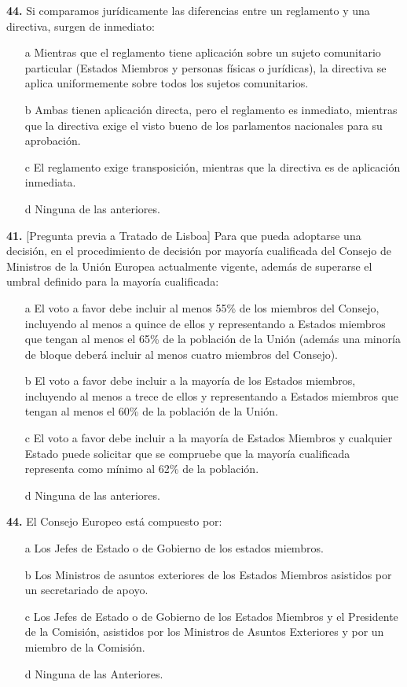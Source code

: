 \documentclass{nuevotema}
\begin{document}
\textbf{44.} Si comparamos jurídicamente las diferencias entre un reglamento y una directiva, surgen de inmediato:
\begin{enumerate}
	\item[a] Mientras que el reglamento tiene aplicación sobre un sujeto comunitario particular (Estados Miembros y personas físicas o jurídicas), la directiva se aplica uniformemente sobre todos los sujetos comunitarios.
	\item[b] Ambas tienen aplicación directa, pero el reglamento es inmediato, mientras que la directiva exige el visto bueno de los parlamentos nacionales para su aprobación.
	\item[c] El reglamento exige transposición, mientras que la directiva es de aplicación inmediata.
	\item[d] Ninguna de las anteriores.
\end{enumerate}


\textbf{41.} [Pregunta previa a Tratado de Lisboa] Para que pueda adoptarse una decisión, en el procedimiento de decisión por mayoría cualificada del Consejo de Ministros de la Unión Europea actualmente vigente, además de superarse el umbral definido para la mayoría cualificada:
\begin{enumerate}
	\item[a] El voto a favor debe incluir al menos 55\% de los miembros del Consejo, incluyendo al menos a quince de ellos y representando a Estados miembros que tengan al menos el 65\% de la población de la Unión (además una minoría de bloque deberá incluir al menos cuatro miembros del Consejo).
	\item[b] El voto a favor debe incluir a la mayoría de los Estados miembros, incluyendo al menos a trece de ellos y representando a Estados miembros que tengan al menos el 60\% de la población de la Unión.
	\item[c] El voto a favor debe incluir a la mayoría de Estados Miembros y cualquier Estado puede solicitar que se compruebe que la mayoría cualificada representa como mínimo al 62\% de la población.
	\item[d] Ninguna de las anteriores.
\end{enumerate}

\textbf{44.} El Consejo Europeo está compuesto por:
\begin{enumerate}
	\item[a] Los Jefes de Estado o de Gobierno de los estados miembros.
	\item[b] Los Ministros de asuntos exteriores de los Estados Miembros asistidos por un secretariado de apoyo.
	\item[c] Los Jefes de Estado o de Gobierno de los Estados Miembros y el Presidente de la Comisión, asistidos por los Ministros de Asuntos Exteriores y por un miembro de la Comisión.
	\item[d] Ninguna de las Anteriores. 
\end{enumerate}
\end{document}
